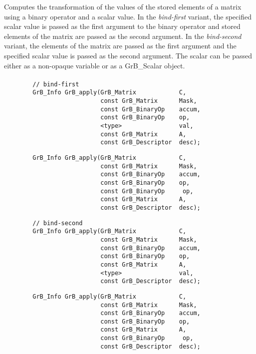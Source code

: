 Computes the transformation of the values of the stored elements of a matrix
using a binary operator and a scalar value. In the {\em bind-first} variant, the 
specified scalar value is passed as the first argument to the binary operator and
stored elements of the matrix are passed as the second argument.  In the {\em
bind-second} variant, the elements of the matrix are passed as the first 
argument and the specified scalar value is passed as the second argument.
{\color{red}
The scalar can be passed either as a non-opaque variable or as
a {\sf GrB\_Scalar} object.
}

\paragraph{\syntax}

\begin{verbatim}
        // bind-first
        GrB_Info GrB_apply(GrB_Matrix            C,
                           const GrB_Matrix      Mask,
                           const GrB_BinaryOp    accum,
                           const GrB_BinaryOp    op,
                           <type>                val,
                           const GrB_Matrix      A,
                           const GrB_Descriptor  desc);
\end{verbatim}

{\color{red}
\begin{verbatim}
        GrB_Info GrB_apply(GrB_Matrix            C,
                           const GrB_Matrix      Mask,
                           const GrB_BinaryOp    accum,
                           const GrB_BinaryOp    op,
                           const GrB_BinaryOp     op,
                           const GrB_Matrix      A,
                           const GrB_Descriptor  desc);
\end{verbatim}
}

\begin{verbatim}
        // bind-second
        GrB_Info GrB_apply(GrB_Matrix            C,
                           const GrB_Matrix      Mask,
                           const GrB_BinaryOp    accum,
                           const GrB_BinaryOp    op,
                           const GrB_Matrix      A,
                           <type>                val,
                           const GrB_Descriptor  desc);
\end{verbatim}

{\color{red}
\begin{verbatim}
        GrB_Info GrB_apply(GrB_Matrix            C,
                           const GrB_Matrix      Mask,
                           const GrB_BinaryOp    accum,
                           const GrB_BinaryOp    op,
                           const GrB_Matrix      A,
                           const GrB_BinaryOp     op,
                           const GrB_Descriptor  desc);
\end{verbatim}
}

